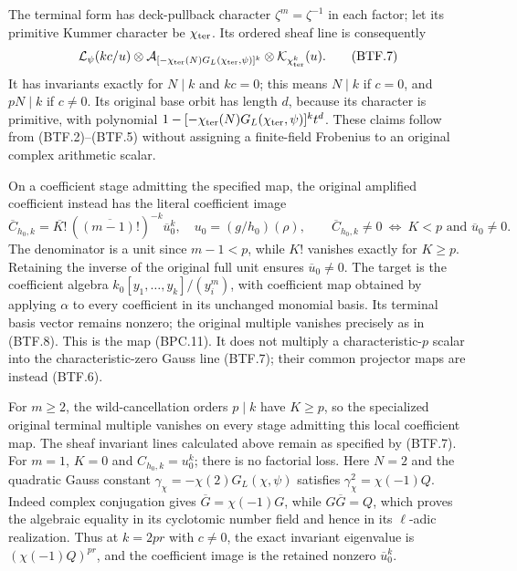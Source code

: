 The terminal form has deck-pullback character
\(\zeta^{m}=\zeta^{-1}\) in each factor; let its
primitive Kummer character be \(\chi_{\rm ter}\).
Its ordered sheaf line is consequently
\[
 \mathcal L_\psi(kc/u)\otimes
 \mathcal A_{[-\chi_{\rm ter}(N)G_L(\chi_{\rm ter},\psi)]^k}
            \otimes\mathcal K_{\chi_{\rm ter}^k}(u).
\tag{BTF.7}\label{eq:btf7}
\]
It has invariants exactly for \(N\mid k\) and
\(kc=0\); this means \(N\mid k\) if \(c=0\),
and \(pN\mid k\) if \(c\ne0\).  Its original
base orbit has length \(d\), because its character
is primitive, with polynomial
\(1-[-\chi_{\rm ter}(N)G_L(\chi_{\rm ter},\psi)]^kt^d\).
These claims follow from (BTF.2)--(BTF.5) without
assigning a finite-field Frobenius to an original
complex arithmetic scalar.

On a coefficient stage admitting the specified map,
the original amplified coefficient instead has the
literal coefficient image
\[
 \overline C_{h_0,k}
   =\overline{K!}\,
      (\overline{(m-1)!})^{-k}\overline u_0^{k},
 \quad u_0=(g/h_0)(\rho),\qquad
 \overline C_{h_0,k}\ne0
   \ \Longleftrightarrow\ K<p\text{ and }\overline u_0\ne0.
\tag{BTF.8}\label{eq:btf8}
\]
The denominator is a unit since \(m-1<p\), while
\(K!\) vanishes exactly for \(K\geq p\).  Retaining
the inverse of the original full unit ensures
\(\overline u_0\ne0\).  The target is the coefficient
algebra \(k_0[y_1,\ldots,y_k]/(y_i^m)\), with
coefficient map obtained by applying \(\alpha\)
to every coefficient in its unchanged monomial
basis.  Its terminal basis vector remains nonzero;
the original multiple vanishes precisely as in
(BTF.8).  This is the map (BPC.11).  It does not
multiply a characteristic-\(p\) scalar into the
characteristic-zero Gauss line (BTF.7); their
common projector maps are instead (BTF.6).

For \(m\geq2\), the wild-cancellation orders
\(p\mid k\) have \(K\geq p\), so the specialized
original terminal multiple vanishes on every
stage admitting this local coefficient map.
The sheaf invariant lines calculated above
remain as specified by (BTF.7).  For \(m=1\),
\(K=0\) and \(C_{h_0,k}=u_0^k\); there is
no factorial loss.  Here \(N=2\) and the
quadratic Gauss constant
\(\gamma_\chi=-\chi(2)G_L(\chi,\psi)\)
satisfies \(\gamma_\chi^2=\chi(-1)Q\).
Indeed complex conjugation gives
\(\overline G=\chi(-1)G\), while \(G\overline G=Q\),
which proves the algebraic equality in its
cyclotomic number field and hence in its
\(\ell\)-adic realization.  Thus at \(k=2pr\)
with \(c\ne0\), the exact invariant eigenvalue
is \((\chi(-1)Q)^{pr}\), and the coefficient
image is the retained nonzero \(\overline u_0^{k}\).

